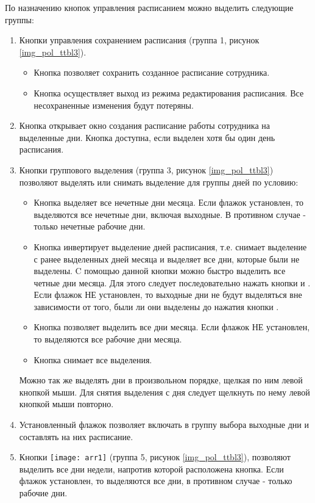 {По назначению кнопок управления расписанием можно выделить следующие группы:
\begin{enumerate}
 \item Кнопки управления сохранением расписания (группа 1, рисунок \ref{img_pol_ttbl3}). 
 \begin{itemize}
  \item Кнопка  позволяет сохранить созданное расписание сотрудника.
  \item Кнопка  осуществляет выход из режима редактирования расписания. Все несохраненные изменения будут потеряны.
 \end{itemize}
 \item Кнопка  открывает окно создания расписание работы сотрудника на выделенные дни. Кнопка доступна, если выделен хотя бы один день расписания.
 \item Кнопки группового выделения (группа 3, рисунок \ref{img_pol_ttbl3}) позволяют выделять или снимать выделение для группы дней по условию:
 \begin{itemize}
  \item Кнопка  выделяет все нечетные дни месяца. Если флажок  установлен, то выделяются все нечетные дни, включая выходные. В противном случае - только нечетные рабочие дни.
 \item Кнопка  инвертирует выделение дней расписания, т.е. снимает выделение с ранее выделенных дней месяца и выделяет все дни, которые были не выделены. C помощью данной кнопки можно быстро выделить все четные дни месяца. Для этого следует последовательно нажать кнопки  и . Если флажок  НЕ установлен, то выходные дни не будут выделяться вне зависимости от того, были ли они выделены до нажатия кнопки .
 \item Кнопка  позволяет выделить все дни месяца. Если флажок  НЕ установлен, то выделяются все рабочие дни месяца.
 \item Кнопка  снимает все выделения.
 \end{itemize}
 Можно так же выделять дни в произвольном порядке, щелкая по ним левой кнопкой мыши. Для снятия выделения с дня следует щелкнуть по нему левой кнопкой мыши повторно.
 \item Установленный флажок  позволяет включать в группу выбора выходные дни и составлять на них расписание.
 \item Кнопки \texttt{[image: arr1]} (группа 5, рисунок \ref{img_pol_ttbl3}),   позволяют выделить все дни недели, напротив которой расположена кнопка. Если флажок  установлен, то выделяются все дни, в противном случае - только рабочие дни.

\end{enumerate}}
